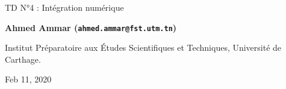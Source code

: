 \documentclass[%
oneside,                 %
final,                   %
10pt,french]{article}
\begin{document}

\newcommand{\exercisesection}[1]{\subsection*{#1}}






\thispagestyle{empty}

\begin{center}
{\LARGE\bf
\begin{spacing}{1.25}
TD N°4 : Intégration numérique
\end{spacing}
}
\end{center}


\begin{center}
{\bf Ahmed Ammar (\texttt{ahmed.ammar@fst.utm.tn})}
\end{center}

    \begin{center}
\centerline{{\small Institut Préparatoire aux Études Scientifiques et Techniques, Université de Carthage.}}
\end{center}
    

\begin{center}
Feb 11, 2020
\end{center}

\vspace{1cm}


\tableofcontents


\vspace{1cm} %



\end{document}
